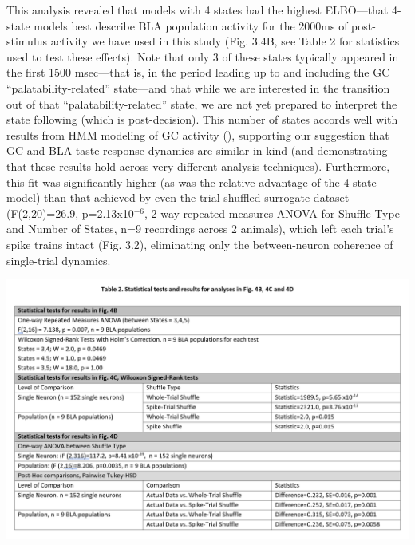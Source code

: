 \begin{refsection}
This analysis revealed that models with 4 states had the highest ELBO—that 4-state models best describe BLA population activity for the 2000ms of post-stimulus activity we have used in this study (Fig. 3.4B, see Table 2 for statistics used to test these effects). Note that only 3 of these states typically appeared in the first 1500 msec—that is, in the period leading up to and including the GC “palatability-related” state—and that while we are interested in the transition out of that “palatability-related” state, we are not yet prepared to interpret the state following (which is post-decision). This number of states accords well with results from HMM modeling of GC activity (\cite{jones2007a,sadacca2016a}), supporting our suggestion that GC and BLA taste-response dynamics are similar in kind (and demonstrating that these results hold across very different analysis techniques). Furthermore, this fit was significantly higher (as was the relative advantage of the 4-state model) than that achieved by even the trial-shuffled surrogate dataset (F(2,20)=26.9, p=2.13x10$^{-6}$, 2-way repeated measures ANOVA for Shuffle Type and Number of States, n=9 recordings across 2 animals), which left each trial’s spike trains intact (Fig. 3.2), eliminating only the between-neuron coherence of single-trial dynamics. 

\begin{tablular}
\centering
    \includegraphics[width=\linewidth]{mahmood_22_figures/table2.PNG}
\end{tablular}


\end{refsection}

